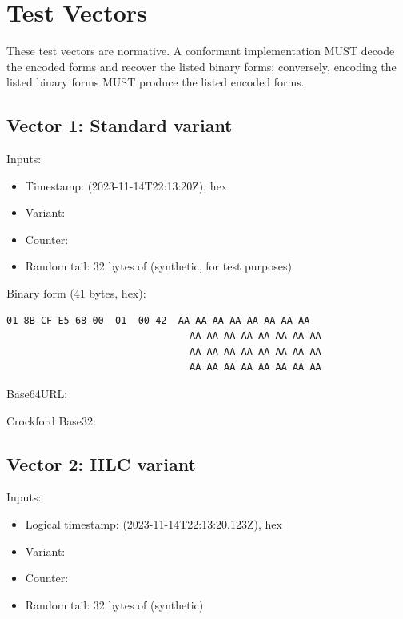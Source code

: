 \appendix

\section{Test Vectors}
\label{app:test-vectors}

These test vectors are normative. A conformant implementation MUST decode the encoded forms and recover the listed binary forms; conversely, encoding the listed binary forms MUST produce the listed encoded forms.

\subsection*{Vector 1: Standard variant}

Inputs:
\begin{itemize}
  \item Timestamp:  (2023-11-14T22:13:20Z), hex 
  \item Variant: 
  \item Counter: 
  \item Random tail: 32 bytes of  (synthetic, for test purposes)
\end{itemize}

Binary form (41 bytes, hex):
\begin{lstlisting}[basicstyle=\ttfamily\scriptsize,frame=single]
01 8B CF E5 68 00  01  00 42  AA AA AA AA AA AA AA AA
                                AA AA AA AA AA AA AA AA
                                AA AA AA AA AA AA AA AA
                                AA AA AA AA AA AA AA AA
\end{lstlisting}

Base64URL: 

Crockford Base32: 

\subsection*{Vector 2: HLC variant}

Inputs:
\begin{itemize}
  \item Logical timestamp:  (2023-11-14T22:13:20.123Z), hex 
  \item Variant: 
  \item Counter: 
  \item Random tail: 32 bytes of  (synthetic)
\end{itemize}


